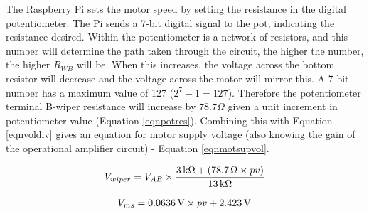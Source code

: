 \documentclass[twoside,a4]{report}
\def\br{\newline \newline \noindent}
\begin{document}
	
	\noindent
	The Raspberry Pi sets the motor speed by setting the resistance in the digital potentiometer. The Pi sends a 7-bit digital signal to the pot, indicating the resistance desired. Within the potentiometer is a network of resistors, and this number will determine the path taken through the circuit, the higher the number, the higher \(R_{WB}\) will be. When this increases, the voltage across the bottom resistor will decrease and the voltage across the motor will mirror this.\br
	A 7-bit number has a maximum value of 127 ($2^7 - 1 = 127$). Therefore the potentiometer terminal B-wiper resistance will increase by $78.7 \Omega$ given a unit increment in potentiometer value (Equation \ref{eqnpotres}). Combining this with Equation \ref{eqnvoldiv} gives an equation for motor supply voltage (also knowing the gain of the operational amplifier circuit) - Equation \ref{eqnmotsupvol}.
	
	\begin{equation}
	V_{wiper} = V_{AB}\times \frac{3{\,\rm k\Omega} + \left(78.7{\,\rm\Omega} \times pv\right)}{13{\,\rm k\Omega}}
	\label{eqnpotres}
	\end{equation}
	
	
	\begin{equation}
	V_{ms} = 0.0636\, {\rm V} \times pv + 2.423\, {\rm V}
	\label{eqnmotsupvol}
	\end{equation}
	
	
\end{document}
